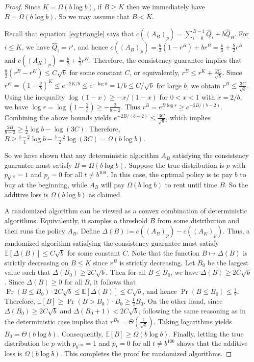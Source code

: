 \begin{proof}
    Since $K=\Omega(b\log b)$, if $B\geq K$ then we immediately have $B=\Omega(b\log b)$. So we may assume that $B<K$.

    Recall that equation~\eqref{eq:triangle} says that $c((A_B)_p)=\sum_{i=0}^{B-1}\hat Q_i+b\hat Q_B$. For $i\leq K$, we have $\hat Q_i=r^i$, and hence $c((A_B)_p)=\frac{b}{2}(1-r^B)+br^B=\frac{b}{2}+\frac{b}{2}r^B$ and $c((A_K)_p)=\frac{b}{2}+\frac{b}{2}r^K$. Therefore, the consistency guarantee implies that $\frac{b}{2}(r^B-r^K)\leq C\sqrt b$ for some constant $C$, or equivalently, $r^B\leq r^K+\frac{2C}{\sqrt b}$. Since $r^K=(1-\frac{2}{b})^K\leq e^{-2K/b}\leq e^{-\log b}=1/b\leq C/\sqrt b$ for large $b$, we obtain $r^B\leq \frac{3C}{\sqrt b}$. Using the inequality $\log(1-x)\geq -x/(1-x)$ for $0<x<1$ with $x=2/b$, we have $\log r=\log(1-\frac{2}{b})\geq -\frac{2}{b-2}$. Thus $r^B=e^{B\log r}\geq e^{-2B/(b-2)}$. Combining the above bounds yields $e^{-2B/(b-2)}\leq \frac{3C}{\sqrt b}$, which implies $\frac{2B}{b-2}\geq \frac{1}{2}\log b-\log(3C)$. Therefore, $B\geq \frac{b-2}{4}\log b-\frac{b-2}{2}\log(3C)=\Omega(b\log b)$.

    So we have shown that any deterministic algorithm $A_B$ satisfying the consistency guarantee must satisfy $B=\Omega(b\log b)$. Suppose the true distribution is $p$ with $p_{b^{100}}=1$ and $p_t = 0$ for all $t \neq b^{100}$. In this case, the optimal policy is to pay $b$ to buy at the beginning, while $A_B$ will pay $\Omega(b \log b)$ to rent until time $B$.  So the additive loss is $\Omega(b\log b)$ as claimed.

    A randomized algorithm can be viewed as a convex combination of deterministic algorithms. Equivalently, it samples a threshold $B$ from some distribution and then runs the policy $A_B$. Define $\Delta(B):=c((A_B)_p)-c((A_K)_p)$. Thus, a randomized algorithm satisfying the consistency guarantee must satisfy $\mathbb{E}[\Delta(B)]\leq C\sqrt b$ for some constant $C$. Note that the function $B\mapsto \Delta(B)$ is strictly decreasing on $B\leq K$ since $r^B$ is strictly decreasing. Let $B_0$ be the largest value such that $\Delta(B_0)\geq 2C\sqrt b$. Then for all $B\leq B_0$, we have $\Delta(B)\geq 2C\sqrt b$. Since $\Delta(B)\geq 0$ for all $B$, it follows that $\Pr(B\leq B_0)\cdot 2C\sqrt b\leq \mathbb{E}[\Delta(B)]\leq C\sqrt b$, and hence $\Pr(B\leq B_0)\leq \frac{1}{2}$. Therefore, $\mathbb{E}[B]\geq \Pr(B>B_0)\cdot B_0\geq \frac{1}{2}B_0$. On the other hand, since $\Delta(B_0)\geq 2C\sqrt b$ and $\Delta(B_0+1)<2C\sqrt b$, following the same reasoning as in the deterministic case implies that $r^{B_0}=\Theta(\frac{1}{\sqrt b})$. Taking logarithms yields $B_0=\Theta(b\log b)$. Consequently, $\mathbb{E}[B]\geq \Omega(b\log b)$. Finally, letting the true distribution be $p$ with $p_{b^{100}}=1$ and $p_t = 0$ for all $t \neq b^{100}$ shows that the additive loss is $\Omega(b\log b)$. This completes the proof for randomized algorithms.
\end{proof}

